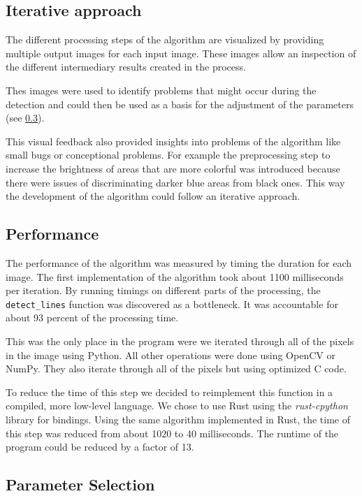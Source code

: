 \documentclass[serif,article,noparskip]{agse-thesis}
\begin{document}
\subsection{Iterative approach}

The different processing steps of the algorithm are visualized by providing
multiple output images for each input image. These images allow an inspection
of the different intermediary results created in the process.

Thes images were used to identify problems that might occur during the detection
and could then be used as a basis for the adjustment of the parameters (see
\ref{parameter}).

This visual feedback also provided insights into problems of the algorithm like
small bugs or conceptional problems. For example the preprocessing step to
increase the brightness of areas that are more colorful was introduced because
there were issues of discriminating darker blue areas from black ones. This way
the development of the algorithm could follow an iterative approach.

\subsection{Performance} \label{performance}

The performance of the algorithm was measured by timing the duration for each
image. The first implementation of the algorithm took about 1100 milliseconds per
iteration. By running timings on different parts of the processing, the
\texttt{detect\_lines} function was discovered as a bottleneck. It was
accountable for about 93 percent of the processing time.

This was the only place in the program were we iterated through all of the pixels
in the image using Python. All other operations were done using OpenCV or NumPy.
They also iterate through all of the pixels but using optimized C code.

To reduce the time of this step we decided to reimplement this function in a
compiled, more low-level language. We chose to use Rust using the \textit{rust-cpython}
library for bindings. Using the same algorithm implemented in Rust, the time of
this step was reduced from about 1020 to 40 milliseconds. The runtime of the
program could be reduced by a factor of 13.

\subsection{Parameter Selection} \label{parameter}
\end{document}

